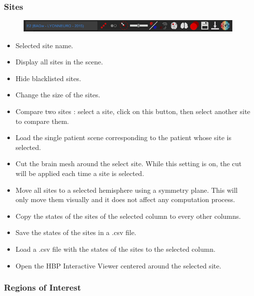 \documentclass[a4paper]{article}
\begin{document}
\subsubsection{Sites}
\begin{figure}[H]
\begin{center}
\includegraphics[scale=0.5]{Sites.png}
\end{center}
\end{figure}
\begin{itemize}
\item Selected site name.
\item Display all sites in the scene.
\item Hide blacklisted sites.
\item Change the size of the sites.
\item Compare two sites : select a site, click on this button, then select another site to compare them.
\item Load the single patient scene corresponding to the patient whose site is selected.
\item Cut the brain mesh around the select site. While this setting is on, the cut will be applied each time a site is selected.
\item Move all sites to a selected hemisphere using a symmetry plane. This will only move them visually and it does not affect any computation process.
\item Copy the states of the sites of the selected column to every other columns.
\item Save the states of the sites in a .csv file.
\item Load a .csv file with the states of the sites to the selected column.
\item Open the HBP Interactive Viewer centered around the selected site.
\end{itemize}
\subsubsection{Regions of Interest}\label{roi}
\end{document}
